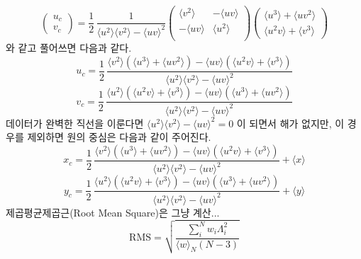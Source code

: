 \documentclass[chapter,a4paper,10pt]{oblivoir}
\begin{document}
\begin{equation}
\left( \begin{array}{ll}
  u_c \\
  v_c
\end{array} \right)
= \frac{1}{2}\,\frac{1}{\langle u^2 \rangle \langle v^2 \rangle - \langle uv \rangle^2}
\left( \begin{array}{cc}
  \langle v^2 \rangle & -\langle uv  \rangle \\
  -\langle uv  \rangle & \langle u^2 \rangle \\
\end{array} \right)
\left( \begin{array}{ll}
  \langle u^3\rangle + \langle uv^2 \rangle \\
  \langle u^2v\rangle + \langle v^3 \rangle 
\end{array} \right)
\end{equation}
와 같고 풀어쓰면 다음과 같다.
\begin{equation}
u_c = \frac{1}{2}\,\frac
{\langle v^2 \rangle \left(\langle u^3\rangle + \langle uv^2 \rangle \right)
 -\langle uv  \rangle \left( \langle u^2v\rangle + \langle v^3 \rangle \right) }
{\langle u^2 \rangle \langle v^2 \rangle - \langle uv \rangle^2}
\end{equation}
\begin{equation}
v_c = \frac{1}{2}\,\frac
{\langle u^2  \rangle \left( \langle u^2v\rangle + \langle v^3 \rangle \right) 
 -\langle uv \rangle \left(\langle u^3\rangle + \langle uv^2 \rangle \right) }
{\langle u^2 \rangle \langle v^2 \rangle - \langle uv \rangle^2}
\end{equation}
데이터가 완벽한 직선을 이룬다면 $\langle u^2 \rangle \langle v^2 \rangle - \langle uv \rangle^2=0$ 이 되면서 해가 없지만, 이 경우를 제외하면 원의 중심은 다음과 같이 주어진다.
\begin{equation}
x_c = \frac{1}{2}\,\frac
{\langle v^2 \rangle \left(\langle u^3\rangle + \langle uv^2 \rangle \right)
 -\langle uv  \rangle \left( \langle u^2v\rangle + \langle v^3 \rangle \right) }
{\langle u^2 \rangle \langle v^2 \rangle - \langle uv \rangle^2} + \langle x \rangle
\end{equation}
\begin{equation}
y_c = \frac{1}{2}\,\frac
{\langle u^2  \rangle \left( \langle u^2v\rangle + \langle v^3 \rangle \right) 
 -\langle uv \rangle \left(\langle u^3\rangle + \langle uv^2 \rangle \right) }
{\langle u^2 \rangle \langle v^2 \rangle - \langle uv \rangle^2} + \langle y \rangle
\end{equation}
제곱평균제곱근(Root Mean Square)은 그냥 계산...
\begin{equation}
\mathrm{RMS} = \sqrt{\frac{\sum_{i}^N w_i \Lambda_i^2 }{\langle w\rangle_N (N-3)}}
\end{equation}
\end{document}
